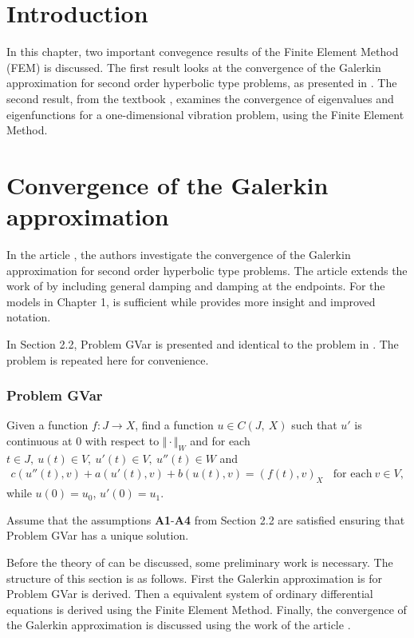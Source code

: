 \documentclass[../../main.tex]{subfiles}
\begin{document}
\section{Introduction}
In this chapter, two important convegence results of the Finite Element Method (FEM) is discussed. The first result looks at the convergence of the Galerkin approximation for second order hyperbolic type problems, as presented in \cite{BV13}. The second result, from the textbook \cite{SF97}, examines the convergence of eigenvalues and eigenfunctions for a one-dimensional vibration problem, using the Finite Element Method.

\section{Convergence of the Galerkin approximation}
In the article \cite{BV13}, the authors investigate the convergence of the Galerkin approximation for second order hyperbolic type problems. The article \cite{BV18} extends the work of \cite{BV13} by including general damping and damping at the endpoints. For the models in Chapter 1, \cite{BV13} is sufficient while \cite{BV18} provides more insight and improved notation.

In Section 2.2, Problem GVar is presented and identical to the problem in \cite{BV13}. The problem is repeated here for convenience.

\subsubsection*{Problem GVar}
Given a function $f:J\rightarrow X$, find a function $u\in C(J,\ X)$ such that $u'$ is continuous at $0$ with respect to $\Vert \cdot \Vert_{W}$ and for each $t\in J,\ u(t)\in V,\ u'(t) \in V,\ u''(t)\in W$ and
\begin{eqnarray}
	c(u''(t),v)+a(u'(t),v)+b(u(t),v)= (f(t),v)_{X} \ \ \ \ \textrm{for each} \ v \in V, \label{GV_PB1}
\end{eqnarray}
while $u(0)=u_{0}$, $u'(0)=u_{1}$.

Assume that the assumptions \textbf{A1}-\textbf{A4} from Section 2.2 are satisfied ensuring that Problem GVar has a unique solution.
 
Before the theory of \cite{BV13} can be discussed, some preliminary work is necessary. The structure of this section is as follows. First the Galerkin approximation is for Problem GVar is derived. Then a equivalent system of ordinary differential equations is derived using the Finite Element Method. Finally, the convergence of the Galerkin approximation is discussed using the work of the article \cite{BV13}.
\end{document}
